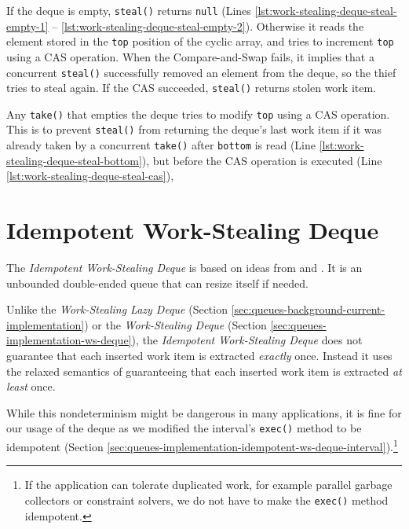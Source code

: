 If the deque is empty, \lstinline!steal()! returns \lstinline!null!
(Lines \ref{lst:work-stealing-deque-steal-empty-1} --
\ref{lst:work-stealing-deque-steal-empty-2}). Otherwise it reads the
element stored in the \lstinline!top! position of the cyclic array,
and tries to increment \lstinline!top! using a CAS operation. When the
Compare-and-Swap fails, it implies that a concurrent
\lstinline!steal()! successfully removed an element from the deque, so
the thief tries to steal again. If the CAS succeeded,
\lstinline!steal()! returns stolen work item.

Any \lstinline!take()! that empties the deque tries to modify
\lstinline!top! using a CAS operation. This is to prevent
\lstinline!steal()!  from returning the deque's last work item if it
was already taken by a concurrent \lstinline!take()! after
\lstinline!bottom! is read (Line
\ref{lst:work-stealing-deque-steal-bottom}), but before the CAS
operation is executed (Line \ref{lst:work-stealing-deque-steal-cas}),




\section{Idempotent Work-Stealing Deque}
\label{sec:queues-implementation-idempotent-ws-deque}

The \emph{Idempotent Work-Stealing Deque} is based on ideas from
\cite{Leijen2009} and \cite{Michael2009}. It is an unbounded
double-ended queue that can resize itself if needed.

Unlike the \emph{Work-Stealing Lazy Deque} (Section
\ref{sec:queues-background-current-implementation}) or the
\emph{Work-Stealing Deque} (Section
\ref{sec:queues-implementation-ws-deque}), the \emph{Idempotent
  Work-Stealing Deque} does not guarantee that each inserted work item
is extracted \emph{exactly} once. Instead it uses the relaxed
semantics of guaranteeing that each inserted work item is extracted
\emph{at least} once.

\VerbatimFootnotes

While this nondeterminism might be dangerous in many applications, it
is fine for our usage of the deque as we modified the interval's
\lstinline!exec()! method to be idempotent (Section
\ref{sec:queues-implementation-idempotent-ws-deque-interval}).\footnote{If
  the application can tolerate duplicated work, for example parallel
  garbage collectors \cite{Flood2001} or constraint solvers, we do not
  have to make the \verb!exec()! method idempotent.}


